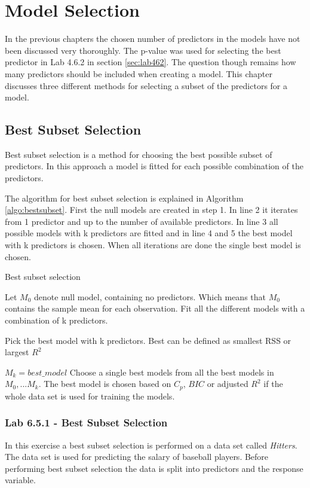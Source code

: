 \chapter{Model Selection}
\label{chp:subsel}

In the previous chapters the chosen number of predictors in the models have not been discussed very thoroughly. The p-value was used for selecting the best predictor in Lab 4.6.2 in section \ref{sec:lab462}. The question though remains how many predictors should be included when creating a model. This chapter discusses three different methods for selecting a subset of the predictors for a model.

\section{Best Subset Selection}
Best subset selection is a method for choosing the best possible subset of predictors. In this approach a model is fitted for each possible combination of the predictors.

The algorithm for best subset selection is explained in Algorithm \ref{algo:bestsubset}. First the null models are created in step 1. In line 2 it iterates from 1 predictor and up to the number of available predictors. In line 3 all possible models with k predictors are fitted and in line 4 and 5 the best model with k predictors is chosen. When all iterations are done the single best model is chosen.

\begin{algorithm}
	\caption{Best subset selection}
	\label{algo:bestsubset}
	\begin{algorithmic}[1]
		\State Let $M_0$ denote null model, containing no predictors. Which means that $M_0$ contains the sample mean for each observation.
		\State Fit all the different models with a combination of k predictors.
		\State \parbox[t]{\dimexpr\linewidth-\algorithmicindent}{Pick the best model with k predictors. Best can be defined as smallest RSS or largest $R^2$}
		\State $M_k = best\_model$
		\EndFor
		\State Choose a single best models from all the best models in $M_0,...M_k$. The best model is chosen based on $C_p$, $BIC$ or adjusted $R^2$ if the whole data set is used for training the models.
	\end{algorithmic}
\end{algorithm}


\subsection{Lab 6.5.1 - Best Subset Selection}
In this exercise a best subset selection is performed on a data set called \emph{Hitters}. The data set is used for predicting the salary of baseball players. Before performing best subset selection the data is split into predictors and the response variable.

